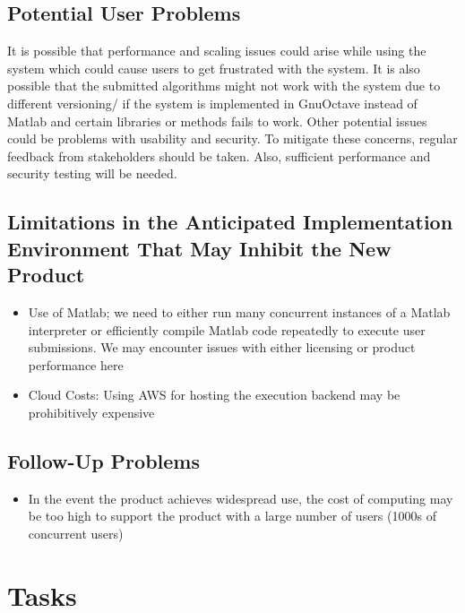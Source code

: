 \documentclass[12pt]{article}
\begin{document}
\subsection{Potential User Problems}
It is possible that performance and scaling issues could arise while using the system which could cause users to get frustrated with the system. It is also possible that the submitted algorithms might not work with the system due to different versioning/ if the system is implemented in GnuOctave instead of Matlab and certain libraries or methods fails to work. Other potential issues could be problems with usability and security. To mitigate these concerns, regular feedback from stakeholders should be taken. Also, sufficient performance and security testing will be needed.

\subsection{Limitations in the Anticipated Implementation Environment That May
Inhibit the New Product}
\begin{itemize}
    \item Use of Matlab; we need to either run many concurrent instances of a Matlab interpreter or efficiently compile Matlab code repeatedly to execute user submissions. We may encounter issues with either licensing or product performance here
    \item Cloud Costs: Using AWS for hosting the execution backend may be prohibitively expensive
\end{itemize}

\subsection{Follow-Up Problems}
\begin{itemize}
    \item In the event the product achieves widespread use, the cost of computing may be too high to support the product with a large number of users (1000s of concurrent users)
\end{itemize}

\section{Tasks}
\end{document}
